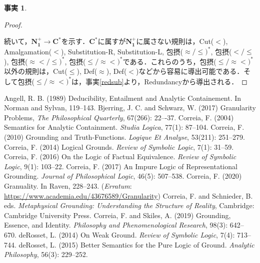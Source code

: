 \documentclass[twoside,14Q,uplatex,dvipdfmx]{jsarticle}
\theoremstyle{definition}
\newtheorem{fact}{事実}
\begin{document}
\begin{fact}
\begin{proof}
\begin{prooftree}
\end{prooftree}



続いて，$\mathbf{N_{1}^{+}}\longrightarrow\mathbf{C^{*}}$を示す．$\mathbf{C^{*}}$に属すが$\mathbf{N_{1}^{+}}$に属さない規則は，Cut($<$), Amalgamation($<$), Substitution-R, Substitution-L, 包摂($\approx/\leq)^{*}$, 包摂($</\leq$), 包摂($\approx</\leq)^{*}$, 包摂($\leq/\approx<)^{*}$である．これらのうち，包摂($\leq/\approx<)^{*}$以外の規則は，Cut($\leq$), Def($\approx$), Def($<$)などから容易に導出可能である．そして包摂($\leq/\approx<)^{*}$は，事実\ref{redsub}より，Redundancyから導出される．
\end{proof}
\end{fact}

\begin{thebibliography}{99}
 Angell, R. B. (1989) Deducibility, Entailment and Analytic Containement. In Norman and Sylvan\cite{NormanandSylvan1989}, 119--143.
 Bjerring, J. C. and Schwarz, W. (2017) Granularity Problems, \emph{The Philosophical Quarterly}, 67(266): 22–-37. 
 Correia, F. (2004) Semantics for Analytic Containment. \emph{Studia Logica}, 77(1): 87--104.
 Correia, F. (2010) Grounding and Truth-Functions. \emph{Logique Et Analyse}, 53(211): 251--279.
 Correia, F. (2014) Logical Grounds. \emph{Review of Symbolic Logic}, 7(1): 31--59. 
 Correia, F. (2016) On the Logic of Factual Equivalence. \emph{Review of Symbolic Logic}, 9(1): 103--22. 
 Correia, F. (2017) An Impure Logic of Representational Grounding. \emph{Journal of Philosophical Logic}, 46(5): 507--538.
 Correia, F. (2020) Granuality. In Raven\cite{Raven2020}, 228--243. (\emph{Erratum}: \url{https://www.academia.edu/43676589/Granularity})
 Correia, F. and Schnieder, B. eds. \emph{Metaphysical Grounding: Understanding the Structure of Reality}, Cambridge: Cambridge University Press.
 Correia, F. and Skiles, A. (2019) Grounding, Essence, and Identity. \emph{Philosophy and Phenomenological Research}, 98(3): 642--670.
 deRosset, L. (2014) On Weak Ground. \emph{Review of Symbolic Logic}, 7(4): 713--744.
 deRosset, L. (2015) Better Semantics for the Pure Logic of Ground. \emph{Analytic Philosophy}, 56(3): 229--252.

\end{thebibliography}
\end{document}
